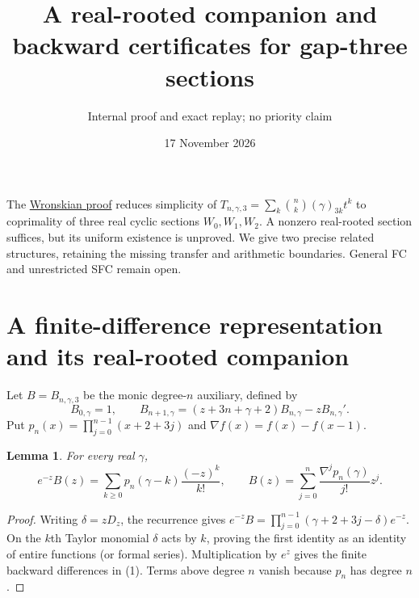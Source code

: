 \documentclass[11pt]{article}
\title{A real-rooted companion and backward certificates for gap-three sections}
\author{Internal proof and exact replay; no priority claim}
\date{17 November 2026}
\newtheorem{lemma}[theorem]{Lemma}
\begin{document}
\maketitle
The \href{GAP_THREE_WRONSKIAN_RECURRENCE.tex}{Wronskian proof} reduces
simplicity of $T_{n,\gamma,3}=\sum_k\binom nk(\gamma)_{3k}t^k$ to
coprimality of three real cyclic sections $W_0,W_1,W_2$.
A nonzero real-rooted section suffices, but its uniform existence is
unproved. We give two precise related structures, retaining the missing
transfer and arithmetic boundaries. General FC and unrestricted SFC
remain open.

\section{A finite-difference representation and its real-rooted companion}
Let $B=B_{n,\gamma,3}$ be the monic degree-$n$ auxiliary, defined by
\[
 B_{0,\gamma}=1,\qquad
 B_{n+1,\gamma}=(z+3n+\gamma+2)B_{n,\gamma}-zB_{n,\gamma}'.
\]
Put $p_n(x)=\prod_{j=0}^{n-1}(x+2+3j)$ and
$\nabla f(x)=f(x)-f(x-1)$.
\begin{lemma}\label{lem:diff}
For every real $\gamma$,
\[
 e^{-z}B(z)=\sum_{k\ge0}p_n(\gamma-k)\frac{(-z)^k}{k!},
 \qquad B(z)=\sum_{j=0}^n\frac{\nabla^jp_n(\gamma)}{j!}z^j.
                                                               \tag{1}
\]
\end{lemma}
\begin{proof}
Writing $\delta=zD_z$, the recurrence gives
$e^{-z}B=\prod_{j=0}^{n-1}(\gamma+2+3j-\delta)e^{-z}$.
On the $k$th Taylor monomial $\delta$ acts by $k$, proving the first
identity as an identity of entire functions (or formal series).
Multiplication by $e^z$ gives the finite backward differences in (1).
Terms above degree $n$ vanish because $p_n$ has degree $n$.
\end{proof}
\end{document}
